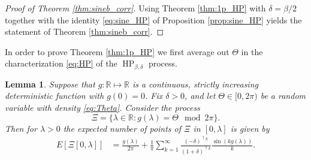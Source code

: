 \documentclass[12pt]{article}
\newtheorem{lemma}[theorem]{Lemma}
\theoremstyle{definition} %
\newcommand{\R}{{\mathbb R}}
\theoremstyle{remark} %
\newcommand{\HPb}{\operatorname{HP}_{\beta, \delta}}
\begin{document}
\begin{proof}[Proof of Theorem \ref{thm:sineb_corr}]
Using Theorem \ref{thm:1p_HP} with $\delta=\beta/2$ together with the identity \eqref{eq:sine_HP} of Proposition \ref{prop:sine_HP} yields the statement of Theorem \ref{thm:sineb_corr}.
\end{proof}

In order to  prove Theorem \ref{thm:1p_HP} we  first average out  $\Theta$ in the characterization \eqref{eq:HP} of the $\HPb$ process. 


\begin{lemma}\label{lem:exp_count}
Suppose that $g : \R\mapsto \R$ is a continuous, strictly increasing deterministic function with $g(0)=0$. Fix $\delta>0$, and let  $\Theta\in[0,2\pi)$ be a random variable with density  \eqref{eq:Theta}. Consider the process
\[
\Xi=\{\lambda\in \R: g(\lambda)=\Theta \mod 2\pi\}.
\]
Then for $\lambda>0$ the expected number of points of $\Xi$ in $[0,\lambda]$ is given by 
\begin{align}\label{eq:Xi_counting}
E[\Xi[0,\lambda]]&=\frac{g(\lambda)}{2\pi}+\frac{1}{\pi}\sum_{k=1}^\infty  \frac{(-\delta)^{\uparrow k}}{(1+ \delta)^{\uparrow k}}\frac{\sin( k g(\lambda))}{k}.
\end{align}
\end{lemma}
\end{document}
